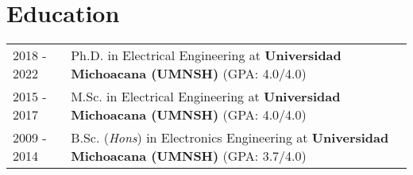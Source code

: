 \documentclass[a4paper,10pt]{article}
\makeatletter
\newenvironment{joblong}[2]
    {
    \begin{tabularx}{\linewidth}{@{}l X r@{}}
    \textbf{#1} & \hfill &  #2 \\[3.75pt]
    \end{tabularx}
    \begin{minipage}[t]{\linewidth}
    \begin{itemize}[nosep,after=\strut, leftmargin=1em, itemsep=3pt,label=--]
    }
    {
    \end{itemize}
    \end{minipage}    
    }
\makeatother
\begin{document}



\section{Education}
\begin{tabularx}{\linewidth}{@{}l X@{}}	
2018 - 2022 & Ph.D. in Electrical Engineering  at \textbf{Universidad Michoacana (UMNSH)} \hfill \normalsize (GPA: 4.0/4.0) \\

2015 - 2017 & M.Sc. in Electrical Engineering at \textbf{Universidad Michoacana (UMNSH)} \hfill (GPA: 4.0/4.0) \\ 

2009 - 2014 & B.Sc. (\textit{Hons}) in Electronics Engineering at \textbf{Universidad Michoacana (UMNSH)} \hfill (GPA: 3.7/4.0) \\ 
\end{tabularx}

\begin{tiny}
    \hspace{6cm}\hrulefill\hspace{6cm}
\end{tiny}
\end{document}
